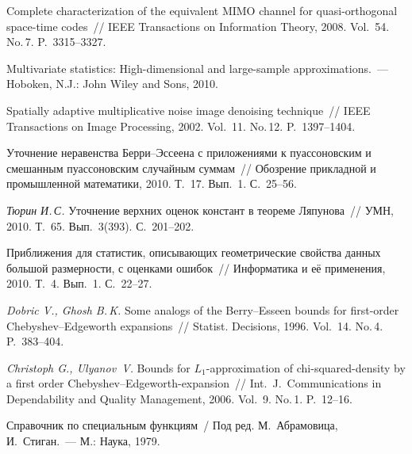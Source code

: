 \begin{multicols}{2}
{{\begin{thebibliography}{99}
Complete characterization of the
equivalent MIMO channel for quasi-orthogonal space-time codes~//
IEEE Transactions on Information Theory, 2008. Vol.~54. No.\,7. P.~3315--3327.


 Multivariate
statistics: High-dimensional and large-sample approximations.~---
Hoboken, N.J.: John Wiley and Sons, 2010.

 Spatially adaptive multiplicative noise
image denoising technique~// IEEE Transactions on Image Processing,
2002. Vol.~11. No.\,12. P.~1397--1404.

 Уточнение неравенства
Берри--Эссеена с приложениями к пуассоновским и смешанным
пуассоновским случайным суммам~// Обозрение прикладной и
промышленной математики, 2010. Т.~17. Вып.~1. С.~25--56.

\emph{Тюрин И.\,С.}  Уточнение верхних оценок констант в теореме Ляпунова~// УМН, 2010. 
Т.~65. Вып.~3(393). С.~201--202.

 Приближения для
статистик, описывающих геометрические свойства данных большой
размерности, с оценками ошибок~// Информатика и её применения, 2010.
Т.~4. Вып.~1. С.~22--27.

\emph{Dobric V., Ghosh B.\,K.} 
Some analogs of the Berry--Esseen bounds for first-order
Chebyshev--Edgeworth expansions~// Statist. Decisions, 1996. Vol.~14. No.\,4. P.~383--404.

\emph{Christoph G., Ulyanov~V.}
Bounds for $L_1$-approximation of chi-squared-density by a first order Chebyshev--Edgeworth-expansion~//
Int.\ J.~Communications in Dependability and Quality Management, 2006. Vol.~9. No.\,1. P.~12--16.

 \label{end\stat}

Справочник по специальным функциям~/ Под ред. М.~Абрамовица, И.~Стиган.~--- М.: Наука, 1979.


 \end{thebibliography}
}
}


\end{multicols}  